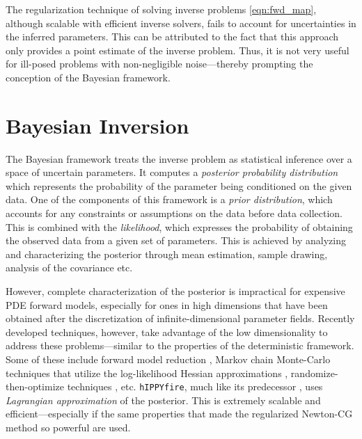 The regularization technique of solving inverse problems \eqref{eqn:fwd_map}, although scalable with efficient inverse solvers, fails to account for uncertainties in the inferred parameters. This can be attributed to the fact that this approach only provides a point estimate of the inverse problem. Thus, it is not very useful for ill-posed problems with non-negligible noise---thereby prompting the conception of the Bayesian framework.

\section{Bayesian Inversion}
\label{sec:bayesian_inversion}
The Bayesian framework treats the inverse problem as statistical inference over a space of uncertain parameters. It computes a \textit{posterior probability distribution} which represents the probability of the parameter being conditioned on the given data. One of the components of this framework is a \textit{prior distribution}, which accounts for any constraints or assumptions on the data before data collection. This is combined with the \textit{likelihood}, which expresses the probability of obtaining the observed data from a given set of parameters. This is achieved by analyzing and characterizing the posterior through mean estimation, sample drawing, analysis of the covariance etc.

However, complete characterization of the posterior is impractical for expensive PDE forward models, especially for ones in high dimensions that have been obtained after the discretization of infinite-dimensional parameter fields. Recently developed techniques, however, take advantage of the low dimensionality to address these problems---similar to the properties of the deterministic framework. Some of these include forward model reduction \cite{galbally2010non}, Markov chain Monte-Carlo techniques that utilize the log-likelihood Hessian approximations \cite{petra2012inexact}, randomize-then-optimize techniques \cite{wang2018randomized}, etc. \texttt{hIPPYfire}, much like its predecessor \cite{villa2018hippylib}, uses \textit{Lagrangian approximation} of the posterior. This is extremely scalable and efficient---especially if the same properties that made the regularized Newton-CG method so powerful are used.

